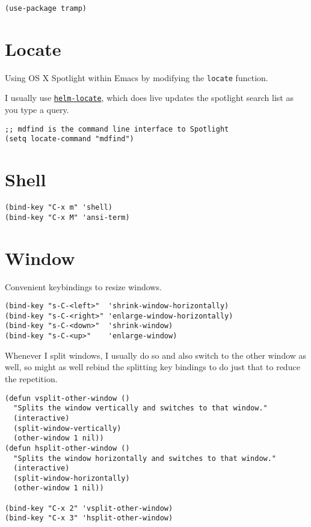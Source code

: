 \documentclass[11pt]{article}
\begin{document}
\begin{verbatim}
(use-package tramp)
\end{verbatim}

\section{Locate}
\label{sec-12}

Using OS X Spotlight within Emacs by modifying the \verb~locate~ function.

I usually use \hyperref[sec-18-9]{\verb~helm-locate~}, which does live updates the spotlight
search list as you type a query.

\begin{verbatim}
;; mdfind is the command line interface to Spotlight
(setq locate-command "mdfind")
\end{verbatim}

\section{Shell}
\label{sec-13}

\begin{verbatim}
(bind-key "C-x m" 'shell)
(bind-key "C-x M" 'ansi-term)
\end{verbatim}

\section{Window}
\label{sec-14}

Convenient keybindings to resize windows.

\begin{verbatim}
(bind-key "s-C-<left>"  'shrink-window-horizontally)
(bind-key "s-C-<right>" 'enlarge-window-horizontally)
(bind-key "s-C-<down>"  'shrink-window)
(bind-key "s-C-<up>"    'enlarge-window)
\end{verbatim}

Whenever I split windows, I usually do so and also switch to the other
window as well, so might as well rebind the splitting key bindings to
do just that to reduce the repetition.

\begin{verbatim}
(defun vsplit-other-window ()
  "Splits the window vertically and switches to that window."
  (interactive)
  (split-window-vertically)
  (other-window 1 nil))
(defun hsplit-other-window ()
  "Splits the window horizontally and switches to that window."
  (interactive)
  (split-window-horizontally)
  (other-window 1 nil))

(bind-key "C-x 2" 'vsplit-other-window)
(bind-key "C-x 3" 'hsplit-other-window)
\end{verbatim}
\end{document}
